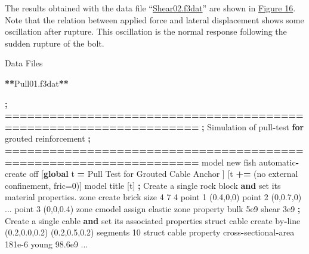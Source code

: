\documentclass[a4paper, nobind]{templates/ociamthesis}
\newenvironment{Shaded}{\begin{snugshade}}{\end{snugshade}}
\newcommand{\BuiltInTok}[1]{#1}
\newcommand{\ControlFlowTok}[1]{\textcolor[rgb]{0.13,0.29,0.53}{\textbf{#1}}}
\newcommand{\DecValTok}[1]{\textcolor[rgb]{0.00,0.00,0.81}{#1}}
\newcommand{\FloatTok}[1]{\textcolor[rgb]{0.00,0.00,0.81}{#1}}
\newcommand{\KeywordTok}[1]{\textcolor[rgb]{0.13,0.29,0.53}{\textbf{#1}}}
\newcommand{\NormalTok}[1]{#1}
\newcommand{\OperatorTok}[1]{\textcolor[rgb]{0.81,0.36,0.00}{\textbf{#1}}}
\newcommand{\StringTok}[1]{\textcolor[rgb]{0.31,0.60,0.02}{#1}}
\renewenvironment{Shaded}
{
  \vspace{10pt}%
  \begin{snugshade}%
}{%
  \end{snugshade}%
  \vspace{8pt}%
}
\begin{document}
The results obtained with the data file
``\protect\hyperlink{pulltestshear02data}{Shear02.f3dat}'' are shown in \protect\hyperlink{pulltest-shear2}{Figure
16}. Note that the relation between applied
force and lateral displacement shows some oscillation after rupture.
This
oscillation is the normal response following the sudden rupture of the
bolt.

\begin{Shaded}
\begin{Highlighting}[]
\NormalTok{Data Files}

\OperatorTok{**}\NormalTok{Pull01.f3dat}\OperatorTok{**}

    \OperatorTok{;} \OperatorTok{==================================================================}
    \OperatorTok{;}\NormalTok{   Simulation of pull}\OperatorTok{{-}}\NormalTok{test }\ControlFlowTok{for}\NormalTok{ grouted reinforcement}
    \OperatorTok{;} \OperatorTok{==================================================================}
\NormalTok{    model new}
\NormalTok{    fish automatic}\OperatorTok{{-}}\NormalTok{create off}
\NormalTok{    [}\KeywordTok{global}\NormalTok{ t }\OperatorTok{=}  \StringTok{\textquotesingle{}Pull Test for Grouted Cable Anchor \textquotesingle{}}\NormalTok{]}
\NormalTok{    [t }\OperatorTok{+=} \StringTok{\textquotesingle{}(no external confinement, fric=0)\textquotesingle{}}\NormalTok{]}
\NormalTok{    model title [t]}
    \OperatorTok{;}\NormalTok{ Create a single rock block }\KeywordTok{and} \BuiltInTok{set}\NormalTok{ its material properties.}
\NormalTok{    zone create brick size }\DecValTok{4} \DecValTok{7} \DecValTok{4}\NormalTok{ point }\DecValTok{1}\NormalTok{ (}\FloatTok{0.4}\NormalTok{,}\DecValTok{0}\NormalTok{,}\DecValTok{0}\NormalTok{) point }\DecValTok{2}\NormalTok{ (}\DecValTok{0}\NormalTok{,}\FloatTok{0.7}\NormalTok{,}\DecValTok{0}\NormalTok{) ...}
\NormalTok{                                 point }\DecValTok{3}\NormalTok{ (}\DecValTok{0}\NormalTok{,}\DecValTok{0}\NormalTok{,}\FloatTok{0.4}\NormalTok{)}
\NormalTok{    zone cmodel assign elastic}
\NormalTok{    zone }\BuiltInTok{property}\NormalTok{ bulk }\FloatTok{5e9}\NormalTok{ shear }\FloatTok{3e9}
    \OperatorTok{;}\NormalTok{ Create a single cable }\KeywordTok{and} \BuiltInTok{set}\NormalTok{ its associated properties}
\NormalTok{    struct cable create by}\OperatorTok{{-}}\NormalTok{line (}\FloatTok{0.2}\NormalTok{,}\FloatTok{0.0}\NormalTok{,}\FloatTok{0.2}\NormalTok{) (}\FloatTok{0.2}\NormalTok{,}\FloatTok{0.5}\NormalTok{,}\FloatTok{0.2}\NormalTok{) segments }\DecValTok{10}
\NormalTok{    struct cable }\BuiltInTok{property}\NormalTok{ cross}\OperatorTok{{-}}\NormalTok{sectional}\OperatorTok{{-}}\NormalTok{area }\FloatTok{181e{-}6}\NormalTok{ young }\FloatTok{98.6e9}\NormalTok{ ...}

\end{Highlighting}
\end{Shaded}
\end{document}
